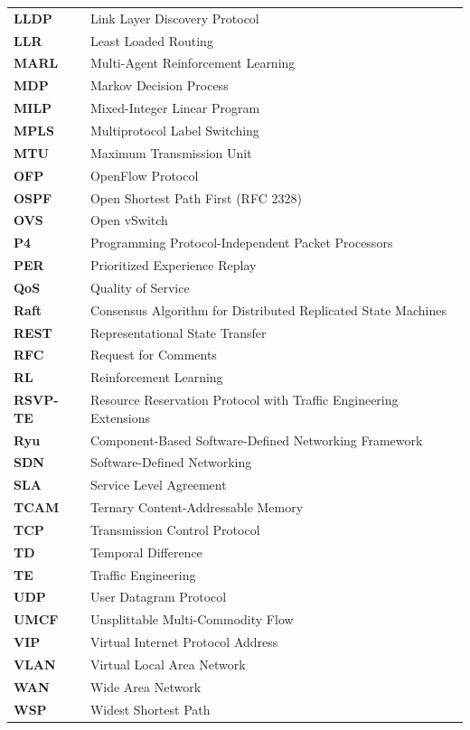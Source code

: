 \documentclass[12pt,a4paper,oneside]{report}
\begin{document}
\begin{longtable}{ll}
\textbf{LLDP} & Link Layer Discovery Protocol \\
\textbf{LLR} & Least Loaded Routing \\
\textbf{MARL} & Multi-Agent Reinforcement Learning \\
\textbf{MDP} & Markov Decision Process \\
\textbf{MILP} & Mixed-Integer Linear Program \\
\textbf{MPLS} & Multiprotocol Label Switching \\
\textbf{MTU} & Maximum Transmission Unit \\
\textbf{OFP} & OpenFlow Protocol \\
\textbf{OSPF} & Open Shortest Path First (RFC 2328) \\
\textbf{OVS} & Open vSwitch \\
\textbf{P4} & Programming Protocol-Independent Packet Processors \\
\textbf{PER} & Prioritized Experience Replay \\
\textbf{QoS} & Quality of Service \\
\textbf{Raft} & Consensus Algorithm for Distributed Replicated State Machines \\
\textbf{REST} & Representational State Transfer \\
\textbf{RFC} & Request for Comments \\
\textbf{RL} & Reinforcement Learning \\
\textbf{RSVP-TE} & Resource Reservation Protocol with Traffic Engineering Extensions \\
\textbf{Ryu} & Component-Based Software-Defined Networking Framework \\
\textbf{SDN} & Software-Defined Networking \\
\textbf{SLA} & Service Level Agreement \\
\textbf{TCAM} & Ternary Content-Addressable Memory \\
\textbf{TCP} & Transmission Control Protocol \\
\textbf{TD} & Temporal Difference \\
\textbf{TE} & Traffic Engineering \\
\textbf{UDP} & User Datagram Protocol \\
\textbf{UMCF} & Unsplittable Multi-Commodity Flow \\
\textbf{VIP} & Virtual Internet Protocol Address \\
\textbf{VLAN} & Virtual Local Area Network \\
\textbf{WAN} & Wide Area Network \\
\textbf{WSP} & Widest Shortest Path \\
\bottomrule
\end{longtable}
\end{document}
